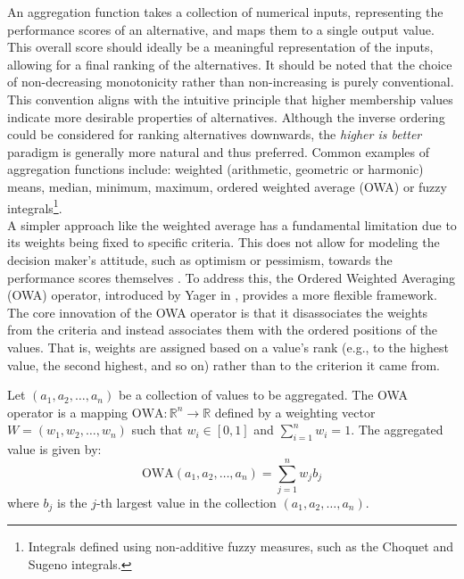 An aggregation function takes a collection of numerical inputs, representing the performance scores of an alternative, and maps them to a single output value. This overall score should ideally be a meaningful representation of the inputs, allowing for a final ranking of the alternatives. It should be noted that the choice of non-decreasing monotonicity rather than non-increasing is purely conventional. This convention aligns with the intuitive principle that higher membership values indicate more desirable properties of alternatives. Although the inverse ordering could be considered for ranking alternatives downwards, the \textit{higher is better} paradigm is generally more natural and thus preferred. Common examples of aggregation functions include: weighted (arithmetic, geometric or harmonic) means, median, minimum, maximum, ordered weighted average (OWA) or fuzzy integrals\footnote{Integrals defined using non-additive fuzzy measures, such as the Choquet and Sugeno integrals.}.\\

A simpler approach like the weighted average has a fundamental limitation due to its weights being fixed to specific criteria. This does not allow for modeling the decision maker's attitude, such as optimism or pessimism, towards the performance scores themselves . To address this, the Ordered Weighted Averaging (OWA) operator, introduced by Yager in \cite{YagerOWA}, provides a more flexible framework. The core innovation of the OWA operator is that it disassociates the weights from the criteria and instead associates them with the ordered positions of the values. That is, weights are assigned based on a value's rank (e.g., to the highest value, the second highest, and so on) rather than to the criterion it came from.\\

\begin{definition}
Let $(a_1, a_2, \dots, a_n)$ be a collection of values to be aggregated. The OWA operator is a mapping $\text{OWA}: \mathbb{R}^n \to \mathbb{R}$ defined by a weighting vector $W = (w_1, w_2, \dots, w_n)$ such that $w_i \in [0, 1]$ and $\sum_{i=1}^{n} w_i = 1$. The aggregated value is given by:
\[
\text{OWA}(a_1, a_2, \dots, a_n) = \sum_{j=1}^{n} w_j b_j
\]
where $b_j$ is the $j$-th largest value in the collection $(a_1, a_2, \dots, a_n)$.
\end{definition}

